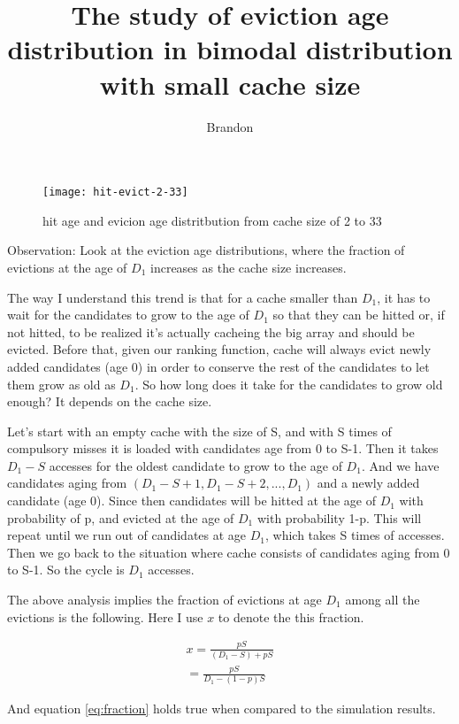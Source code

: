 \documentclass[12pt, letterpaper]{article}
\title{The study of eviction age distribution in bimodal distribution with
small cache size}
\author{Brandon}
\begin{document}
\maketitle

\begin{figure}[h]
\texttt{[image: hit-evict-2-33]}
\caption{hit age and evicion age distritbution from cache size of 2 to 33}
\end{figure}

Observation: Look at the eviction age distributions, where the fraction of
evictions at the age of $D_{1}$ increases as the cache size increases. 

The way I understand this trend is that for a cache smaller than $D_{1}$, it
has to wait for the candidates to grow to the age of $D_1$ so that they can be
hitted or, if not hitted, to be realized it's actually cacheing the big array
and should be evicted. Before that, given our ranking function, cache will
always evict newly added candidates (age $0$) in order to conserve the rest of
the candidates to let them grow as old as $D_{1}$. So how long does it take for
the candidates to grow old enough? It depends on the cache size.

Let's start with an empty cache with the size of S, and with S times of
compulsory misses it is loaded with candidates age from 0 to S-1. Then it takes
$D_{1}-S$ accesses for the oldest candidate to grow to the age of $D_{1}$. And
we have candidates aging from $(D_{1}-S+1,D_{1}-S+2,...,D_{1})$ and a newly
added candidate (age 0). Since then candidates will be hitted at the age of $D_{1}$ with probability of p, and evicted at the age of $D_{1}$ with probability 1-p.
This will repeat until we run out of candidates at age $D_{1}$, which takes S times of accesses. Then we go back to the situation where cache consists of candidates aging from 0 to S-1. So the cycle is $D_{1}$ accesses.

The above analysis implies the fraction of evictions at age $D_{1}$ among all the evictions is the following. Here I use $x$ to denote the this fraction. 


\begin{equation}
\label{eq:fraction}
\begin{split}
x = \frac{pS}{(D_{1}-S)+pS} \\
= \frac{pS}{D_{1}-(1-p)S}
\end{split}
\end{equation}

And equation \ref{eq:fraction} holds true when compared to the simulation
results.
\end{document}
